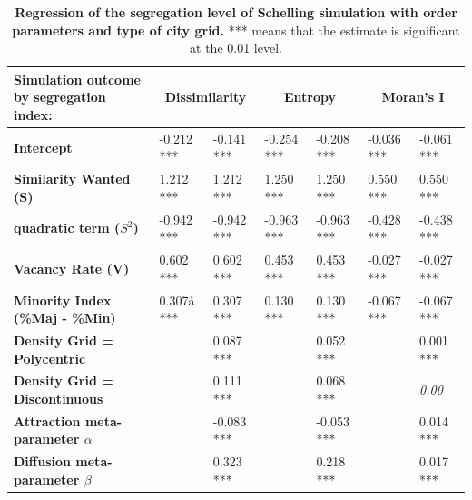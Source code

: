 \documentclass[3p,times,procedia]{elsarticle}
\begin{document}
\begin{table}[]
\centering
\caption{\textbf{Regression of the segregation level of Schelling simulation with order parameters and type of city grid.} *** means that the estimate is significant at the 0.01 level.}
\label{tab:regressionSchelling}
\begin{adjustwidth}{-1cm}{-1cm}
\begin{tabular}{|m{2.5cm}|ll|ll|ll|}
\hline
Simulation outcome by segregation index:    & \multicolumn{2}{c|}{\textbf{Dissimilarity}}   & \multicolumn{2}{c|}{\textbf{Entropy}} & \multicolumn{2}{c|}{\textbf{Moran's I}} \\ \hline
\textbf{Intercept}                          & -0.212 *** & -0.141 ***                       & -0.254 ***        & -0.208 ***        & -0.036 ***           & -0.061 ***               \\ \hline
\textbf{Similarity Wanted (S)}              & 1.212 ***  & 1.212 ***                        & 1.250 ***         & 1.250 ***         & 0.550 ***            & 0.550 ***                \\ 
\textbf{quadratic term ($S^2$)}               & -0.942 *** & -0.942 ***                       & -0.963 ***        & -0.963 ***        & -0.428 ***           & -0.438 ***               \\ 
\textbf{Vacancy Rate (V)}                   & 0.602 ***  & 0.602 ***                        & 0.453 ***         & 0.453 ***         & -0.027 ***           & -0.027 ***               \\ 
\textbf{Minority Index (\%Maj - \%Min)}     & 0.307å ***  & 0.307 ***                        & 0.130 ***         & 0.130 ***         & -0.067 ***           & -0.067 ***               \\ \hline
\textbf{Density Grid = Polycentric}         &            & 0.087 ***                        &                   & 0.052 ***         &                      & 0.001 ***                \\ 
\textbf{Density Grid = Discontinuous}       &            & 0.111 ***                        &                   & 0.068 ***         &                      & \textit{0.00}              \\
\textbf{Attraction meta-parameter $\alpha$} &            & -0.083 ***                       &                   & -0.053 ***        &                      & 0.014 ***                \\ 
\textbf{Diffusion meta-parameter $\beta$}   &            & 0.323 ***                        &                   & 0.218 ***         &                      & 0.017 ***           \\ \hline

\end{tabular}
\end{adjustwidth}
\end{table}
\end{document}
